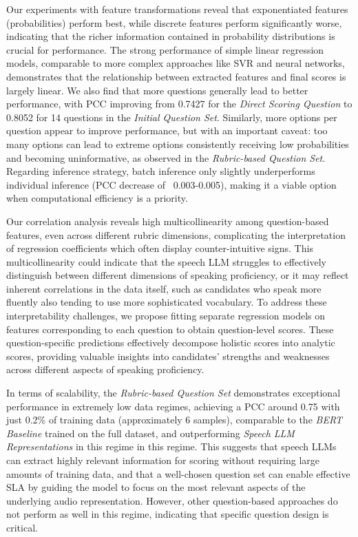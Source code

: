 \documentclass{report}
\begin{document}
Our experiments with feature transformations reveal that exponentiated features (probabilities) perform best, while discrete features perform significantly worse, indicating that the richer information contained in probability distributions is crucial for performance. The strong performance of simple linear regression models, comparable to more complex approaches like SVR and neural networks, demonstrates that the relationship between extracted features and final scores is largely linear. We also find that more questions generally lead to better performance, with PCC improving from 0.7427 for the \emph{Direct Scoring Question} to 0.8052 for 14 questions in the \emph{Initial Question Set}. Similarly, more options per question appear to improve performance, but with an important caveat: too many options can lead to extreme options consistently receiving low probabilities and becoming uninformative, as observed in the \emph{Rubric-based Question Set}. Regarding inference strategy, batch inference only slightly underperforms individual inference (PCC decrease of ~0.003-0.005), making it a viable option when computational efficiency is a priority.

Our correlation analysis reveals high multicollinearity among question-based features, even across different rubric dimensions, complicating the interpretation of regression coefficients which often display counter-intuitive signs. This multicollinearity could indicate that the speech LLM struggles to effectively distinguish between different dimensions of speaking proficiency, or it may reflect inherent correlations in the data itself, such as candidates who speak more fluently also tending to use more sophisticated vocabulary. To address these interpretability challenges, we propose fitting separate regression models on features corresponding to each question to obtain question-level scores. These question-specific predictions effectively decompose holistic scores into analytic scores, providing valuable insights into candidates' strengths and weaknesses across different aspects of speaking proficiency.

In terms of scalability, the \emph{Rubric-based Question Set} demonstrates exceptional performance in extremely low data regimes, achieving a PCC around 0.75 with just 0.2\% of training data (approximately 6 samples), comparable to the \emph{BERT Baseline} trained on the full dataset, and outperforming \emph{Speech LLM Representations} in this regime in this regime. This suggests that speech LLMs can extract highly relevant information for scoring without requiring large amounts of training data, and that a well-chosen question set can enable effective SLA by guiding the model to focus on the most relevant aspects of the underlying audio representation. However, other question-based approaches do not perform as well in this regime, indicating that specific question design is critical.
\end{document}
